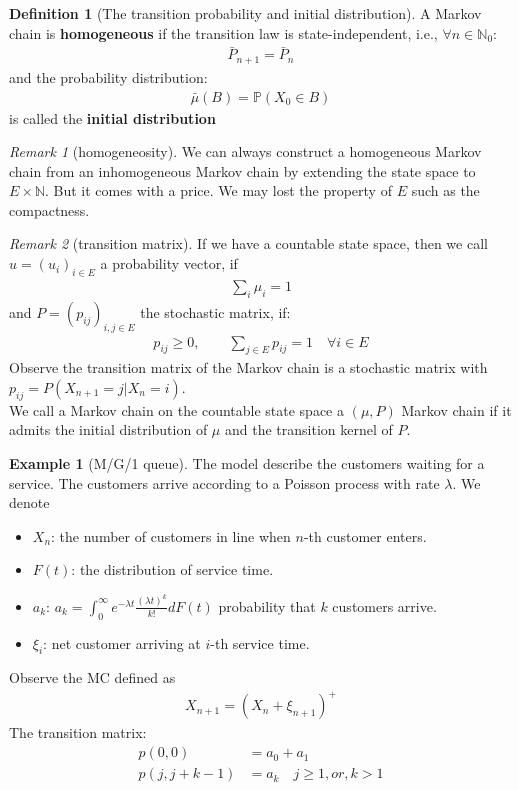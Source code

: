 \documentclass[a4paper,11pt]{book}
\theoremstyle{definition}
\newtheorem{definition}{Definition}[section]
\newtheorem*{example}{Example}
\theoremstyle{remark}
\newtheorem*{remark}{Remark}
\begin{document}
 \begin{definition}[The transition probability and initial distribution]
 	A Markov chain is \textbf{homogeneous }if the transition law is state-independent, i.e., $\forall n \in \mathbb{N}_0$:
 	\begin{align*}
 		\bar{P}_{n+1} = \bar{P}_n
 	\end{align*}
 	and the probability distribution:
 	\begin{align*}
 		\bar{\mu}(B) =  \mathbb{P}(X_0 \in B)
 	\end{align*}
 	is called the \textbf{initial distribution}
 \end{definition}
 
\begin{remark}[homogeneosity]
 We can always construct a homogeneous Markov chain from an inhomogeneous Markov chain by extending the state space to $E \times \mathbb{N}$. But it comes with a price.	 We may lost the property of $E$ such as the compactness.
\end{remark}

\begin{remark}[transition matrix]
If we have a countable state space, then we call $u = (u_i)_{i \in E}$ a probability vector, if
 \begin{align*}
 	\sum_i \mu_i = 1
 \end{align*}
 and $P = (p_{ij})_{i, j \in E}$ the stochastic matrix, if:
 \begin{align*}
 	p_{ij} \geq 0, \qquad \sum_{j \in E} p_{ij} = 1 \quad \forall i \in E
 \end{align*}
 Observe the transition matrix of the Markov chain is a stochastic matrix with $p_{ij} = P(X_{n + 1} = j|X_n = i)$.\\
 We call a Markov chain on the countable state space a $(\mu, P)$ Markov chain if it admits the initial distribution of $\mu$ and the transition kernel  of $P$.
\end{remark}

\begin{example}[M/G/1 queue]
The model describe the customers waiting for a service. The customers arrive according to a Poisson process with rate $\lambda$. We denote
\begin{itemize}
	\item $X_n$: the number of customers in line when $n$-th customer enters.
	\item $F(t)$: the distribution of service time.
	\item $a_k$: $a_k = \int_0^\infty e^{-\lambda t} \frac{(\lambda t)^k}{k!} dF(t)$ probability that $k$ customers arrive.
	\item $\xi_i$: net customer arriving at $i$-th service time.
\end{itemize}
Observe the MC defined as
\begin{align*}
	X_{n+1} = (X_n + \xi_{n+1})^+
\end{align*}
The transition matrix:
\begin{align*}
	p(0, 0) &= a_0 + a_1\\
	p(j, j + k - 1) &= a_k \quad j \ge 1, or, k > 1
\end{align*}
\end{example}
\end{document}
